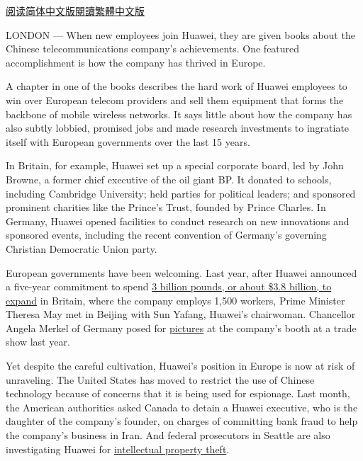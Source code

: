 \href{https://cn.nytimes.com/technology/20190123/huawei-europe-china/}{阅读简体中文版}\href{https://cn.nytimes.com/technology/20190123/huawei-europe-china/zh-hant/}{閱讀繁體中文版}

LONDON --- When new employees join Huawei, they are given books about
the Chinese telecommunications company's achievements. One featured
accomplishment is how the company has thrived in Europe.

A chapter in one of the books describes the hard work of Huawei
employees to win over European telecom providers and sell them equipment
that forms the backbone of mobile wireless networks. It says little
about how the company has also subtly lobbied, promised jobs and made
research investments to ingratiate itself with European governments over
the last 15 years.

In Britain, for example, Huawei set up a special corporate board, led by
John Browne, a former chief executive of the oil giant BP. It donated to
schools, including Cambridge University; held parties for political
leaders; and sponsored prominent charities like the Prince's Trust,
founded by Prince Charles. In Germany, Huawei opened facilities to
conduct research on new innovations and sponsored events, including the
recent convention of Germany's governing Christian Democratic Union
party.

European governments have been welcoming. Last year, after Huawei
announced a five-year commitment to spend
\href{https://www.huawei.com/en/press-events/news/2018/2/Huawei-new3bn-fiveyear-commitment-UK}{3
billion pounds, or about \$3.8 billion, to expand} in Britain, where the
company employs 1,500 workers, Prime Minister Theresa May met in Beijing
with Sun Yafang, Huawei's chairwoman. Chancellor Angela Merkel of
Germany posed for
\href{https://www.huawei.eu/media-centre/press-releases/chancellor-merkel-visits-huawei-dlt-2018}{pictures}
at the company's booth at a trade show last year.

Yet despite the careful cultivation, Huawei's position in Europe is now
at risk of unraveling. The United States has moved to restrict the use
of Chinese technology because of concerns that it is being used for
espionage. Last month, the American authorities asked Canada to detain a
Huawei executive, who is the daughter of the company's founder, on
charges of committing bank fraud to help the company's business in Iran.
And federal prosecutors in Seattle are also investigating Huawei for
\href{https://www.nytimes.com/2019/01/16/technology/huawei-investigation-trade-secrets.html?rref=collection\%2Fbyline\%2Fraymond-zhong\&action=click\&contentCollection=undefined\&region=stream\&module=stream_unit\&version=latest\&contentPlacement=1\&pgtype=collection}{intellectual
property theft}.

